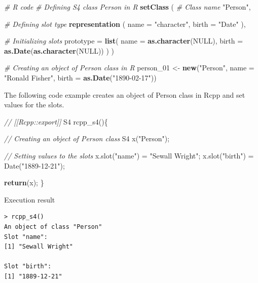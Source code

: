 \documentclass[
]{book}
\newenvironment{Shaded}{\begin{snugshade}}{\end{snugshade}}
\newcommand{\CommentTok}[1]{\textcolor[rgb]{0.56,0.35,0.01}{\textit{#1}}}
\newcommand{\ControlFlowTok}[1]{\textcolor[rgb]{0.13,0.29,0.53}{\textbf{#1}}}
\newcommand{\DataTypeTok}[1]{\textcolor[rgb]{0.13,0.29,0.53}{#1}}
\newcommand{\DecValTok}[1]{\textcolor[rgb]{0.00,0.00,0.81}{#1}}
\newcommand{\KeywordTok}[1]{\textcolor[rgb]{0.13,0.29,0.53}{\textbf{#1}}}
\newcommand{\NormalTok}[1]{#1}
\newcommand{\OtherTok}[1]{\textcolor[rgb]{0.56,0.35,0.01}{#1}}
\newcommand{\StringTok}[1]{\textcolor[rgb]{0.31,0.60,0.02}{#1}}
\begin{document}
\begin{Shaded}
\begin{Highlighting}[]
\CommentTok{# R code}
\CommentTok{# Defining S4 class Person in R}
\KeywordTok{setClass}\NormalTok{ (}
  \CommentTok{# Class name}
  \StringTok{"Person"}\NormalTok{,}

  \CommentTok{# Defining slot type}
  \KeywordTok{representation}\NormalTok{ (}
    \DataTypeTok{name =} \StringTok{"character"}\NormalTok{,}
    \DataTypeTok{birth =} \StringTok{"Date"}
\NormalTok{  ),}

  \CommentTok{# Initializing slots}
  \DataTypeTok{prototype =} \KeywordTok{list}\NormalTok{(}
    \DataTypeTok{name =} \KeywordTok{as.character}\NormalTok{(}\OtherTok{NULL}\NormalTok{),}
    \DataTypeTok{birth =} \KeywordTok{as.Date}\NormalTok{(}\KeywordTok{as.character}\NormalTok{(}\OtherTok{NULL}\NormalTok{))}
\NormalTok{  )}
\NormalTok{)}

\CommentTok{# Creating an object of Person class in R}
\NormalTok{person_}\DecValTok{01}\NormalTok{ <-}\StringTok{ }\KeywordTok{new}\NormalTok{(}\StringTok{"Person"}\NormalTok{,}
                 \DataTypeTok{name =} \StringTok{"Ronald Fisher"}\NormalTok{,}
                 \DataTypeTok{birth =} \KeywordTok{as.Date}\NormalTok{(}\StringTok{"1890-02-17"}\NormalTok{))}
\end{Highlighting}
\end{Shaded}

The following code example creates an object of Person class in Rcpp and set values for the slots.

\begin{Shaded}
\begin{Highlighting}[]
\CommentTok{// [[Rcpp::export]]}
\NormalTok{S4 rcpp_s4()\{}

    \CommentTok{// Creating an object of Person class}
\NormalTok{    S4 x(}\StringTok{"Person"}\NormalTok{);}

    \CommentTok{// Setting values to the slots}
\NormalTok{    x.slot(}\StringTok{"name"}\NormalTok{)  = }\StringTok{"Sewall Wright"}\NormalTok{;}
\NormalTok{    x.slot(}\StringTok{"birth"}\NormalTok{) = Date(}\StringTok{"1889-12-21"}\NormalTok{);}

    \ControlFlowTok{return}\NormalTok{(x);}
\NormalTok{\}}
\end{Highlighting}
\end{Shaded}

Execution result

\begin{verbatim}
> rcpp_s4()
An object of class "Person"
Slot "name":
[1] "Sewall Wright"

Slot "birth":
[1] "1889-12-21"
\end{verbatim}
\end{document}
